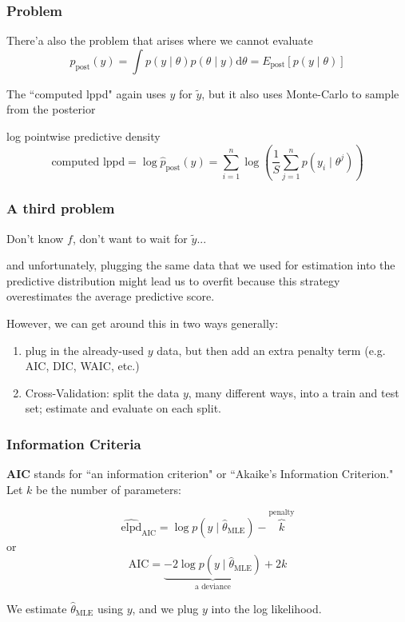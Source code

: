 \documentclass{beamer}
\begin{document}
\begin{frame}
\frametitle{Problem}

There'a also the problem that arises where we cannot evaluate 
\[
p_{\text{post}}(y) = \int p(y \mid \theta) p(\theta \mid y) \text{d}\theta = E_{\text{post}}[p(y \mid \theta)]
\]

The ``computed lppd" again uses $y$ for $\tilde{y}$, but it also uses Monte-Carlo to sample from the posterior 
\begin{block}{log pointwise predictive density}
\[
\text{computed lppd} = \log \hat{p}_{\text{post}}(y) = \sum_{i=1}^n \log \left( \frac{1}{S} \sum_{j=1}^n p(y_i \mid \theta^j) \right) 
\]
\end{block}



\end{frame}



\begin{frame}
\frametitle{A third problem}

Don't know $f$, don't want to wait for $\tilde{y}$...
\newline

and unfortunately, plugging the same data that we used for estimation into the predictive distribution might lead us to overfit because this strategy overestimates the average predictive score. 
\newline
\pause

However, we can get around this in two ways generally:
\begin{enumerate}
\item plug in the already-used $y$ data, but then add an extra penalty term (e.g. AIC, DIC, WAIC, etc.)
\item Cross-Validation: split the data $y$, many different ways, into a train and test set; estimate and evaluate on each split.
\end{enumerate}

\end{frame}

\begin{frame}
\frametitle{Information Criteria}

{\bf AIC} stands for ``an information criterion" or ``Akaike's Information Criterion." Let $k$ be the number of parameters:
\newline

\[
\widehat{\text{elpd}}_{\text{AIC}} = \log p(y \mid \hat{\theta}_{\text{MLE}}) - \overbrace{k}^{\text{penalty}}
\]
or
\[
\text{AIC} = \underbrace{-2\log p(y \mid \hat{\theta}_{\text{MLE}})}_{\text{a deviance}} +2 k
\]

We estimate $\hat{\theta}_{\text{MLE}}$ using $y$, \*and\* we plug $y$ into the log likelihood. 

\end{frame}
\end{document}
